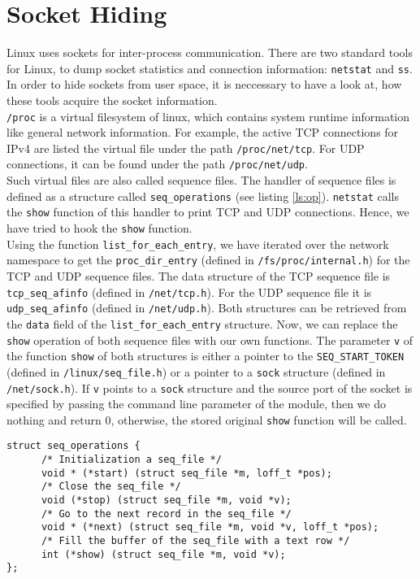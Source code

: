 \section{Socket Hiding}
Linux uses sockets for inter-process communication. There are two standard tools for Linux, to dump socket statistics and connection information: \texttt{netstat} and \texttt{ss}. In order to hide sockets from user space, it is neccessary to have a look at, how these tools acquire the socket information. \\
\verb+/proc+ is a virtual filesystem of linux, which contains system runtime information like general network information. For example, the active TCP connections for IPv4 are listed the virtual file under the path \verb+/proc/net/tcp+. For UDP connections, it can be found under the path \verb+/proc/net/udp+.\\
Such virtual files are also called sequence files. The handler of sequence files 
is defined as a structure called \verb+seq_operations+ (see listing 
\ref{ls:op}). \verb+netstat+ calls the \verb+show+ function of this handler to print TCP and UDP 
connections. Hence, we have tried to hook the \verb+show+ function.\\
Using the function \verb+list_for_each_entry+, we have iterated over the network 
namespace to get the \verb+proc_dir_entry+ (defined in 
\verb+/fs/proc/internal.h+) for the TCP and UDP sequence files. The data 
structure of the TCP sequence file is \verb+tcp_seq_afinfo+ (defined in 
\verb+/net/tcp.h+). For the UDP sequence file it is \verb+udp_seq_afinfo+ 
(defined in \verb+/net/udp.h+). Both structures can be retrieved from the 
\verb+data+ field of the \verb+list_for_each_entry+ structure. Now, we can 
replace the \verb+show+ operation of both sequence files with our own 
functions. The parameter \verb+v+ of the function \verb+show+ of both 
structures is either a pointer to the \verb+SEQ_START_TOKEN+ (defined in 
\verb+/linux/seq_file.h+) or a pointer to a \verb+sock+ structure (defined in 
\verb+/net/sock.h+). If \verb+v+ points to a \verb+sock+ structure and the 
source port of the socket is specified by passing the command line parameter of 
the module, then we do nothing and return 0, otherwise, the stored original 
\verb+show+ function will be called.
\lstset{escapechar=&,style=customc}
\begin{lstlisting}[captionpos=b, caption={The \texttt{seq\_operations} structure defined in \texttt{/linux/seq\_file.h}}, label={ls:op}]
struct seq_operations {
      /* Initialization a seq_file */		
      void * (*start) (struct seq_file *m, loff_t *pos);
      /* Close the seq_file */
      void (*stop) (struct seq_file *m, void *v);
      /* Go to the next record in the seq_file */
      void * (*next) (struct seq_file *m, void *v, loff_t *pos);
      /* Fill the buffer of the seq_file with a text row */
      int (*show) (struct seq_file *m, void *v);
};
\end{lstlisting}
